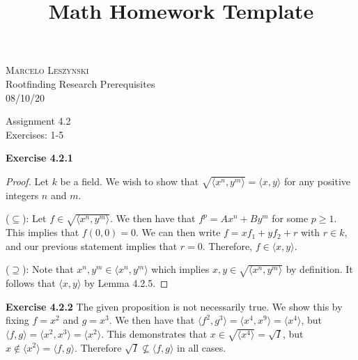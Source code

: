 \documentclass[12pt,oneside]{article}
\newenvironment{exercise}[1]{\vspace{.1in}\noindent\textbf{Exercise #1 \hspace{.05em}}}{}
\begin{document}
\title{Math Homework Template}

\begin{flushright}
\textsc{Marcelo Leszynski}  \\
Rootfinding Research Prerequisites\\
08/10/20
\end{flushright}

\begin{center}
\textsf{Assignment 4.2 } \\
\textsf{Exercises: 1-5 }
\end{center}


\begin{exercise}{4.2.1}
    \begin{proof}
        Let $k$ be a field. We wish to show that 
        $\sqrt{\langle x^n, y^m \rangle} = \langle x,y\rangle$ for any positive integers 
        $n$ and $m$. 

        \bigskip
        ($\subseteq$): Let $f \in \sqrt{\langle x^n, y^m \rangle}$. We then have that 
        $f^p = Ax^n + By^m$ for some $p \geq 1$. This implies that $f(0,0) = 0$. We 
        can then write $f = xf_1 + yf_2 + r$ with $r \in k$, and our previous statement 
        implies that $r = 0$. Therefore, $f \in \langle x,y \rangle$.
                
        \bigskip
        ($\supseteq$): Note that $x^n, y^m \in \langle x^n,y^m \rangle$ which implies 
        $x,y \in \sqrt{\langle x^n,y^m \rangle}$ by definition. It follows that 
        $\langle x,y \rangle$ by Lemma 4.2.5.
    \end{proof}
\end{exercise}


\begin{exercise}{4.2.2}
    The given proposition is not necessarily true. We show this by fixing $f = x^2$ and 
    $g = x^3$. We then have that 
    $\langle f^2,g^3 \rangle = \langle x^4,x^9 \rangle = \langle x^4 \rangle$, but
    $\langle f,g \rangle = \langle x^2,x^3 \rangle = \langle x^2 \rangle$. This demonstrates
    that $x \in \sqrt{\langle x^4 \rangle} = \sqrt{I}$, but 
    $x \not \in \langle x^2 \rangle = \langle f,g \rangle$. Therefore 
    $\sqrt{I} \not \subseteq \langle f,g \rangle$ in all cases.
\end{exercise}
\end{document}
